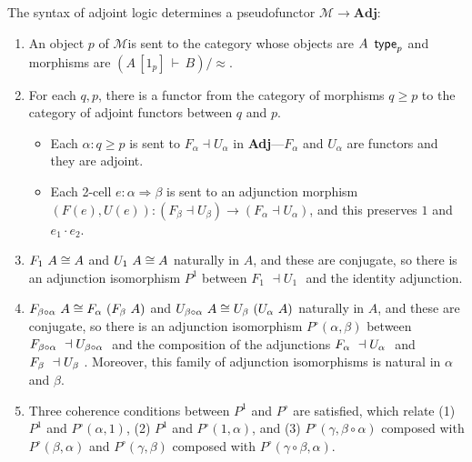 \documentclass{drl-common/llncs}
\newcommand{\M}{\ensuremath{\mathcal{M}}}
\newcommand{\la}{\ensuremath{\dashv}}
\newcommand{\tc}[2]{\ensuremath{#1 \Rightarrow #2}}
\newcommand{\Adj}{\textbf{Adj}}
\newcommand\compo[2]{\ensuremath{#1 \circ #2}}
\newcommand\compv[2]{\ensuremath{#1 \cdot #2}}
\renewcommand\wftp[2]{\ensuremath{#1 \,\,\, \dsd{type}_{#2}}}
\newcommand\F[2]{\ensuremath{F_{#1} \,\, #2}}
\newcommand\U[2]{\ensuremath{U_{#1} \,\, #2}}
\newcommand\seq[3]{\ensuremath{#1 \, [ #2 ] \, \vdash \, #3}}
\newcommand\ap[2]{\ensuremath{#1 \approx #2}}
\begin{document}
\begin{theorem} \label{thm:syntacticpseudofunctor}
The syntax of adjoint logic determines a pseudofunctor $\M \to \Adj$:
\begin{enumerate}
\item An object $p$ of \M is sent to the category whose objects are
  \wftp{A}{p} and morphisms are $(\seq{A}{1_p}{B})/\ap{}{}$.
\item For each $q,p$, there is a functor from the category of morphisms
  $q \ge p$ to the category of adjoint functors between $q$ and $p$.
  \begin{itemize}
  \item 
  Each $\alpha : q \ge p$ is sent to $F_\alpha \la U_\alpha$ in
  \Adj---$F_\alpha$ and $U_\alpha$ are functors and they are adjoint.

  \item Each 2-cell $e : \tc{\alpha}{\beta}$ is sent to an adjunction
    morphism $(F(e),U(e)) : (F_\beta \la U_\beta) \to (F_\alpha \la
    U_\alpha)$, and this preserves $1$ and $\compv{e_1}{e_2}$.
  \end{itemize}

\item $\F 1 A \iso A$ and $\U 1 A \iso A$ naturally in $A$, and these
  are conjugate, so there is an adjunction isomorphism $P^1$ between $\F 1 {}
  \la \U 1 {}$ and the identity adjunction.

\item $\F {\compo{\beta}{\alpha}} A \iso \F \alpha {(\F \beta A)}$ and
  $\U {\compo{\beta}{\alpha}} A \iso \U \beta {(\U \alpha A)}$ naturally
  in $A$, and these are conjugate, so there is an adjunction isomorphism
  $P^{\circ}(\alpha,\beta)$ between $\F {\compo{\beta}{\alpha}} \la \U
  {\compo{\beta}{\alpha}}$ and the composition of the adjunctions $\F
  {\alpha} \la \U {\alpha}$ and $\F {\beta} \la \U {\beta}$.  Moreover,
  this family of adjunction isomorphisms is natural in $\alpha$ and
  $\beta$.

\item Three coherence conditions between $P^1$ and $P^\circ$ are
  satisfied, which relate (1) $P^1$ and $P^\circ(\alpha,1)$,
  (2) $P^1$ and $P^\circ(1,\alpha)$, and (3) 
  $P^\circ(\gamma,\compo{\beta}{\alpha})$ composed with
  $P^\circ(\beta,\alpha)$ and $P^\circ(\gamma,\beta)$ composed with
  $P^\circ(\compo{\gamma}{\beta},\alpha)$.  
\end{enumerate}
\end{theorem}
\end{document}
